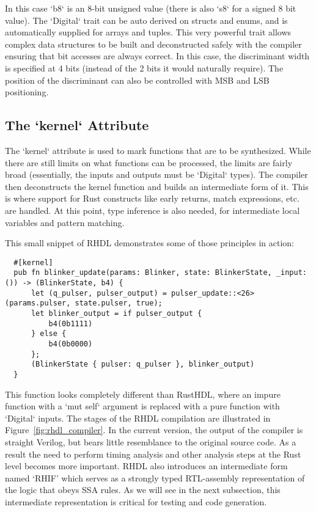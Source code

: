 \documentclass[conference]{IEEEtran}
\begin{document}
In this case `b8` is an 8-bit unsigned value (there is also `s8` for a signed 8 bit value).  The `Digital` trait can be
auto derived on structs and enums, and is automatically supplied for arrays and tuples.  This very powerful trait allows 
complex data structures to be built and deconstructed safely with the compiler ensuring that bit accesses are always correct.
In this case, the discriminant width is specified at 4 bits (instead of the 2 bits it would naturally require).  The position 
of the discriminant can also be controlled with MSB and LSB positioning. 

\subsection{The `kernel` Attribute}
The `kernel` attribute is used to mark functions that are to be synthesized.  While there are still limits on what 
functions can be processed, the limits are fairly broad (essentially, the inputs and outputs must be `Digital` types). 
The compiler then deconstructs the kernel function and builds an intermediate form of it.  This is where support for
Rust constructs like early returns, match expressions, etc. are handled.   At this point, type inference is also needed, 
for intermediate local variables and pattern matching.  

This small snippet of RHDL demonstrates some of those principles in action:
\begin{verbatim}
  #[kernel]
  pub fn blinker_update(params: Blinker, state: BlinkerState, _input: ()) -> (BlinkerState, b4) {
      let (q_pulser, pulser_output) = pulser_update::<26>(params.pulser, state.pulser, true);
      let blinker_output = if pulser_output {
          b4(0b1111)
      } else {
          b4(0b0000)
      };
      (BlinkerState { pulser: q_pulser }, blinker_output)
  }
\end{verbatim}
This function looks completely different than RustHDL, where an impure function with a `mut self` argument
is replaced with a pure function with `Digital` inputs.  The stages of the RHDL compilation are illustrated in 
Figure~\ref{fig:rhdl_compiler}.  In the current version, the output of the compiler is straight Verilog, but bears
little resemblance to the original source code.  As a result the need to perform timing analysis and other analysis
steps at the Rust level becomes more important.  RHDL also introduces an intermediate form named `RHIF' which 
serves as a strongly typed RTL-assembly representation of the logic that obeys SSA rules.  As we will see in the
next subsection, this intermediate representation is critical for testing and code generation.
\end{document}

